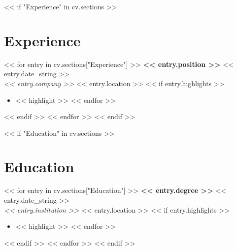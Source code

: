 \documentclass[10pt, letterpaper]{article}
\begin{document}
\begin{paracol}{2}
\begin{rightcolumn}
    << if "Experience" in cv.sections >>
    \section*{Experience}
    << for entry in cv.sections["Experience"] >>
    \noindent\textbf{<< entry.position >>} \hfill << entry.date_string >> \\
    \textit{<< entry.company >>} \hfill << entry.location >>
    << if entry.highlights >>
    \begin{itemize}
        << for highlight in entry.highlights >>
        \item << highlight >>
        << endfor >>
    \end{itemize}
    << endif >>
    \vspace{1em}
    << endfor >>
    << endif >>

    << if "Education" in cv.sections >>
    \section*{Education}
    << for entry in cv.sections["Education"] >>
    \noindent\textbf{<< entry.degree >>} \hfill << entry.date_string >> \\
    \textit{<< entry.institution >>} \hfill << entry.location >>
    << if entry.highlights >>
    \begin{itemize}
        << for highlight in entry.highlights >>
        \item << highlight >>
        << endfor >>
    \end{itemize}
    << endif >>
    \vspace{1em}
    << endfor >>
    << endif >>

\end{rightcolumn}
\end{paracol}
\end{document}
